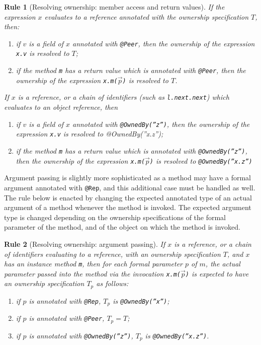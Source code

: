 \documentclass{pracamgr}
\theoremstyle{break}
\theoremstyle{break}
\theoremstyle{break}
\newtheorem{verrule}{Rule}
\begin{document}
\begin{verrule}[Resolving ownership: member access and return values]
  \label{vrl:res:acc}
  If the expression $x$ evaluates to a reference annotated with
  the ownership specification $T$, then:
  \begin{enumerate}[label=(\arabic*)]
  \item if $v$ is a field of $x$ annotated with \texttt{@Peer}, then
    the ownership of the expression \texttt{x.v} is resolved to $T$;
  \item \label{pnt:peer-ret} if the method \texttt{m} has a return value which is annotated
    with \texttt{@Peer}, then the ownership of the expression
    \texttt{x.m($\vec{p}$)} is resolved to $T$.
  \end{enumerate}
  If $x$ is a reference, or a chain of identifiers (such as
  \texttt{l.next.next}) which evaluates to an object reference, then
  \begin{enumerate}[label=(\arabic*), resume]
  \item if $v$ is a field of $x$ annotated with
    \texttt{@OwnedBy(''z'')}, then the ownership of the expression
    \texttt{x.v} is resolved to @OwnedBy(''x.z'');
  \item if the method \texttt{m} has a return value which is
    annotated with \texttt{@OwnedBy(''z'')}, then the ownership of
    the expression \texttt{x.m($\vec{p}$)} is resolved to
    \texttt{@OwnedBy(''x.z'')}
  \end{enumerate}
\end{verrule}

Argument passing is slightly more sophisticated as a method may have a
formal argument annotated with \texttt{@Rep}, and this additional case
must be handled as well. The rule below is enacted by changing the
expected annotated type of an actual argument of a method whenever the
method is invoked. The expected argument type is changed depending on
the ownership specifications of the formal parameter of the method,
and of the object on which the method is invoked.

\begin{verrule}[Resolving ownership: argument passing]
  If $x$ is a reference, or a chain of identifiers evaluating to a
  reference, with an ownership specification $T$, and $x$ has an
  instance method \texttt{m}, then for each formal parameter $p$ of
  $m$, the actual parameter passed into the method via the invocation
  \texttt{x.m($\vec{p}$)} is expected to have an ownership
  specification $T_p$ as follows:
  \begin{enumerate}[label=(\arabic*)]
  \item if $p$ is annotated with \texttt{@Rep}, $T_p$ is \texttt{@OwnedBy(''x'')};
  \item if $p$ is annotated with \texttt{@Peer}, $T_p = T$;
  \item if $p$ is annotated with \texttt{@OwnedBy(''z'')}, $T_p$ is
    \texttt{@OwnedBy(''x.z'')}.
  \end{enumerate}
\end{verrule}
\end{document}
